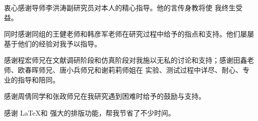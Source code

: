 \begin{acknowledgement}
  衷心感谢导师李洪涛副研究员对本人的精心指导。他的言传身教将使
  我终生受益。

  同时感谢同组的王健老师和韩彦军老师在研究过程中给予的指点和支持。他们屡屡基于他们的经验对我予以指导。

  感谢程宏师兄在文献调研阶段和仿真阶段对我施以无私的讨论和支持；感谢田鑫老师、欧春晖师兄、唐小兵师兄和谢莉莉师姐在
  实验、测试过程中详尽、耐心、专业的指导和陪同。

  感谢周倩同学和张政师兄在我研究遇到困难时给予的鼓励与支持。
 
  感谢 \LaTeX 和 \thuthesis 强大的排版功能，帮我节省了不少时间。
\end{acknowledgement}